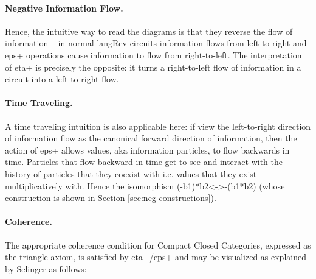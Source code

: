 \documentclass[preprint]{sigplanconf}
\begin{document}
\paragraph*{Negative Information Flow.} 
Hence, the intuitive way to read the diagrams is that they reverse the
flow of information -- in normal {{langRev}} circuits information
flows from left-to-right and {{eps+}} operations cause information to
flow from right-to-left.  The interpretation of {{eta+}} is precisely
the opposite: it turns a right-to-left flow of information in a
circuit into a left-to-right flow.

\begin{multicols}{2}
\begin{center}
\end{center}
  
\begin{center}
\end{center}  
\end{multicols}

\paragraph*{Time Traveling.}
A time traveling intuition is also applicable here: if view the
left-to-right direction of information flow as the canonical forward
direction of information, then the action of {{eps+}} allows values,
aka information particles, to flow backwards in time. Particles that
flow backward in time get to see and interact with the history of
particles that they coexist with i.e. values that they exist
multiplicatively with. Hence the isomorphism {{(-b1)*b2<->-(b1*b2)}}
(whose construction is shown in Section \ref{sec:neg-constructions}).

\paragraph*{Coherence.}
The appropriate coherence condition for Compact Closed Categories,
expressed as the triangle axiom, is satisfied by {{eta+}}/{{eps+}} and
may be visualized as explained by Selinger
\cite{springerlink:10.1007/978-3-642-12821-94} as follows:
\end{document}
